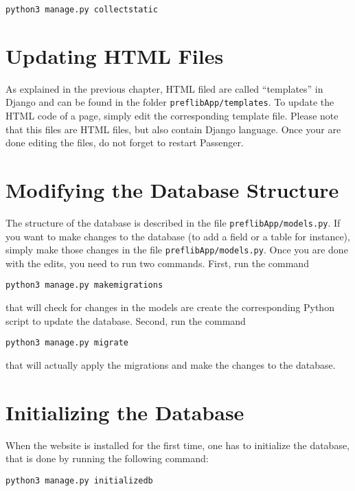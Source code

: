 \documentclass{report}
\begin{document}
	\begin{center}
		\texttt{python3 manage.py collectstatic}
	\end{center}
	
	\section{Updating HTML Files}
	
	As explained in the previous chapter, HTML filed are called ``templates'' in Django and can be found in the folder \texttt{preflibApp/templates}. To update the HTML code of a page, simply edit the corresponding template file. Please note that this files are HTML files, but also contain Django language. Once your are done editing the files, do not forget to restart Passenger.
	
	\section{Modifying the Database Structure}
	
	The structure of the database is described in the file \texttt{preflibApp/models.py}. If you want to make changes to the database (to add a field or a table for instance), simply make those changes in the file \texttt{preflibApp/models.py}. Once you are done with the edits, you need to run two commands. First, run the command
	
	\begin{center}
		\texttt{python3 manage.py makemigrations}
	\end{center}

	\noindent that will check for changes in the models are create the corresponding Python script to update the database. Second, run the command
	
	\begin{center}
		\texttt{python3 manage.py migrate}
	\end{center}

	\noindent that will actually apply the migrations and make the changes to the database.
	
	\section{Initializing the Database}
	
	When the website is installed for the first time, one has to initialize the database, that is done by running the following command:
	
	\begin{center}
		\texttt{python3 manage.py initializedb}
	\end{center}
	
\end{document}

